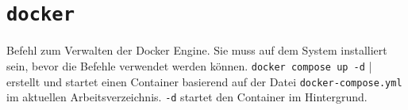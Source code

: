 \documentclass{article}
\newcommand{\doublebreak}{\break\break}
\begin{document}
	\newpage
	
	\section{\texttt{docker}}
	Befehl zum Verwalten der Docker Engine. Sie muss auf dem System installiert sein, bevor die Befehle verwendet werden können.
	\doublebreak
	\texttt{docker compose up -d} | erstellt und startet einen Container basierend auf der Datei \texttt{docker-compose.yml} im aktuellen Arbeitsverzeichnis. \texttt{-d} startet den Container im Hintergrund. 
	
\end{document}
